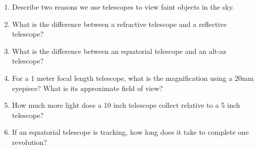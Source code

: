 
\begin{enumerate}
\item Describe two reasons we use telescopes to view faint objects in
  the sky.
\vspace{80pt}
\item  What is the difference between a refractive telescope and a
  reflective telescope?
\vspace{80pt}
\item  What is the difference between an equatorial telescope and an
  alt-az telescope?
\vspace{80pt}
\item For a 1 meter focal length telescope, what is the magnification
  using a 20mm eyepiece? What is its approximate field of view?
\vspace{80pt}
\item How much more light does a 10 inch telescope collect relative to
  a 5 inch telescope?
\vspace{80pt}
\item If an equatorial telescope is tracking, how long does it take to
  complete one revolution? 
\vspace{80pt}
\end{enumerate}
